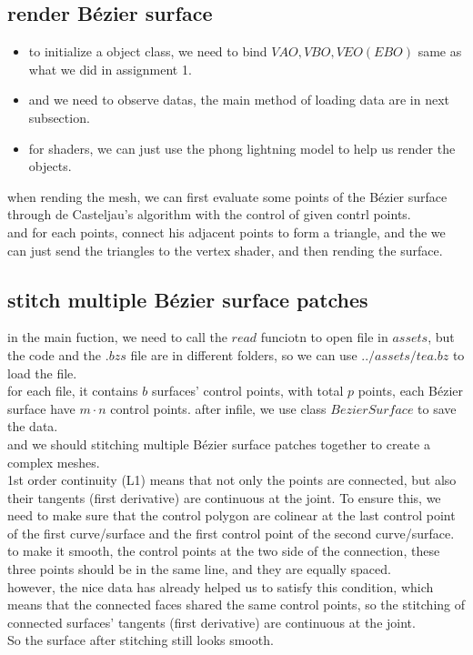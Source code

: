 \documentclass[acmtog]{acmart}
\begin{document}
\subsection{render Bézier surface}
\begin{itemize}
	\item to initialize a object class, we need to bind $VAO,VBO,VEO(EBO)$ same as what we did in assignment 1.
	\item and we need to observe datas, the main method of loading data are in next subsection.
	\item for shaders, we can just use the phong lightning model to help us render the objects.
\end{itemize}
when rending the mesh, we can first evaluate some points of the Bézier surface through de Casteljau's algorithm with the control of given contrl points.\\
and for each points, connect his adjacent points to form a triangle, and the we can just send the triangles to the vertex shader, and then rending the surface.

\subsection{stitch multiple Bézier surface patches}
in the main fuction, we need to call the $read$ funciotn to open file in $assets$, but the code and the $.bzs$ file are in different
folders, so we can use $../assets/tea.bz$ to load the file.\\
for each file, it contains $b$ surfaces' control points, with total $p$ points, each Bézier surface have $m\cdot n$ control points.
after infile, we use class $BezierSurface$ to save the data.\\
and we should stitching multiple Bézier surface patches together to create a complex meshes.\\
1st order continuity (L1) means that not only the points are connected, but also their tangents (first derivative) are continuous at the joint. To ensure this, we need to make sure that the control polygon are colinear at the last control point of the first curve/surface and the first control point of the second curve/surface.\\
to make it smooth, the control points at the two side of the connection, these three points should be in the 
same line, and they are equally spaced.\\ 
however, the nice data has already helped us to satisfy this condition, which means that the connected faces
shared the same control points, so the stitching of connected surfaces' tangents (first derivative) are continuous at the joint.\\
So the surface after stitching still looks smooth.
\end{document}
